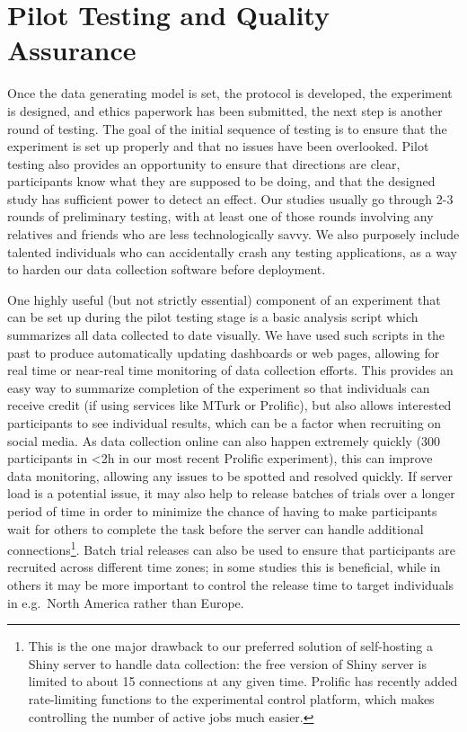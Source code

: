 \documentclass[
  10pt,
  letterpaper,
  DIV=11,
  numbers=noendperiod]{scrartcl}
\begin{document}
\section{Pilot Testing and Quality Assurance}\label{sec-pilot-test}

Once the data generating model is set, the protocol is developed, the
experiment is designed, and ethics paperwork has been submitted, the
next step is another round of testing. The goal of the initial sequence
of testing is to ensure that the experiment is set up properly and that
no issues have been overlooked. Pilot testing also provides an
opportunity to ensure that directions are clear, participants know what
they are supposed to be doing, and that the designed study has
sufficient power to detect an effect. Our studies usually go through 2-3
rounds of preliminary testing, with at least one of those rounds
involving any relatives and friends who are less technologically savvy.
We also purposely include talented individuals who can accidentally
crash any testing applications, as a way to harden our data collection
software before deployment.

One highly useful (but not strictly essential) component of an
experiment that can be set up during the pilot testing stage is a basic
analysis script which summarizes all data collected to date visually. We
have used such scripts in the past to produce automatically updating
dashboards or web pages, allowing for real time or near-real time
monitoring of data collection efforts. This provides an easy way to
summarize completion of the experiment so that individuals can receive
credit (if using services like MTurk or Prolific), but also allows
interested participants to see individual results, which can be a factor
when recruiting on social media. As data collection online can also
happen extremely quickly (300 participants in \textless2h in our most
recent Prolific experiment), this can improve data monitoring, allowing
any issues to be spotted and resolved quickly. If server load is a
potential issue, it may also help to release batches of trials over a
longer period of time in order to minimize the chance of having to make
participants wait for others to complete the task before the server can
handle additional connections\footnote{This is the one major drawback to
  our preferred solution of self-hosting a Shiny server to handle data
  collection: the free version of Shiny server is limited to about 15
  connections at any given time. Prolific has recently added
  rate-limiting functions to the experimental control platform, which
  makes controlling the number of active jobs much easier.}. Batch trial
releases can also be used to ensure that participants are recruited
across different time zones; in some studies this is beneficial, while
in others it may be more important to control the release time to target
individuals in e.g.~North America rather than Europe.
\end{document}
